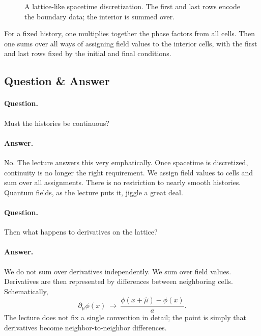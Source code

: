 \begin{figure}[h]
\centering
{}
\caption{A lattice-like spacetime discretization. The first and last rows encode the boundary data; the interior is summed over.}
\end{figure}

For a fixed history, one multiplies together the phase factors from all cells. Then one sums over all ways of assigning field values to the interior cells, with the first and last rows fixed by the initial and final conditions.

\subsection{Question \& Answer}

\paragraph{Question.} Must the histories be continuous?

\paragraph{Answer.} No. The lecture answers this very emphatically. Once spacetime is discretized, continuity is no longer the right requirement. We assign field values to cells and sum over all assignments. There is no restriction to nearly smooth histories. Quantum fields, as the lecture puts it, jiggle a great deal.

\paragraph{Question.} Then what happens to derivatives on the lattice?

\paragraph{Answer.} We do not sum over derivatives independently. We sum over field values. Derivatives are then represented by differences between neighboring cells. Schematically,
\begin{equation}
\partial_\mu \phi(x)\ \longrightarrow\ \frac{\phi(x+\hat\mu)-\phi(x)}{a}.
\end{equation}
The lecture does not fix a single convention in detail; the point is simply that derivatives become neighbor-to-neighbor differences.

